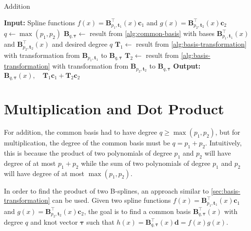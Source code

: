 \begin{algorithm}
    \caption{Addition}\label{alg:addition}
    \begin{algorithmic}[1]
        \State \textbf{Input:} Spline functions $f(x) = \mathbf{B}_{p_1, \mathbf{t}_1}^{\top}(x) \mathbf{c}_1$ and $g(x) = \mathbf{B}_{p_2, \mathbf{t}_2}^{\top}(x) \mathbf{c}_2$
        \State $q \gets \max(p_1, p_2)$
        \State $\mathbf B_{q, \boldsymbol{\tau}} \gets $ result from \cref{alg:common-basis} with bases $\mathbf{B}_{p_1, \mathbf{t}_1}^{\top}(x)$ and $\mathbf{B}_{p_2, \mathbf{t}_2}^{\top}(x)$ and desired degree $q$
        \State $\mathbf T_1 \gets $ result from \cref{alg:basis-transformation} with transformation from $\mathbf B_{p_1, \mathbf{t}_1}$ to $\mathbf B_{q, \boldsymbol{\tau}}$
        \State $\mathbf T_2 \gets $ result from \cref{alg:basis-transformation} with transformation from $\mathbf B_{p_2, \mathbf{t}_2}$ to $\mathbf B_{q, \boldsymbol{\tau}}$
        \State \textbf{Output:} $\mathbf B_{q, \boldsymbol{\tau}}(x), \quad\mathbf T_1 \mathbf c_1 + \mathbf T_2 \mathbf c_2$
    \end{algorithmic}
\end{algorithm}

\section{Multiplication and Dot Product}

For addition, the common basis had to have degree $q \geq \max(p_1, p_2)$, but for multiplication, the degree of the common basis must be $q = p_1 + p_2$. Intuitively, this is because the product of two polynomials of degree $p_1$ and $p_2$ will have degree of at most $p_1 + p_2$ while the sum of two polynomials of degree $p_1$ and $p_2$ will have degree of at most $\max(p_1, p_2)$.

In order to find the product of two B-splines, an approach similar to \cref{sec:basis-transformation} can be used. Given two spline functions $f(x) = \mathbf{B}_{p_1, \mathbf{t}_1}^{\top}(x) \mathbf{c}_1$ and $g(x) = \mathbf{B}_{p_2, \mathbf{t}_2}^{\top}(x) \mathbf{c}_2$, the goal is to find a common basis $\mathbf{B}_{q, \boldsymbol{\tau}}^{\top}(x)$ with degree $q$ and knot vector $\boldsymbol{\tau}$ such that $h(x) = \mathbf{B}_{q, \boldsymbol{\tau}}^{\top}(x) \mathbf{d} = f(x)  g(x)$.

